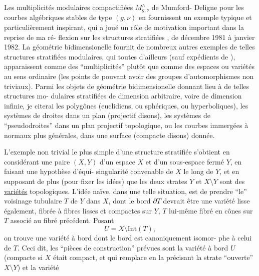 
Les multiplicités modulaires compactifiées $M^{\wedge}_{g,\nu}$ de Mumford-%
Deligne pour les courbes algébriques stables de type $(g,\nu)$ en
fournissent un exemple typique et particulièrement inspirant, qui
a joué un rôle de motivation important dans la reprise de ma ré-%
flexion sur les structures stratifiées , de décembre 1981 à janvier
1982. La géométrie bidimensionelle fournit de nombreux autres
exemples de telles structures stratifiées modulaires, qui toutes
d'ailleurs (sauf expédients de ), apparaissent
comme des ``multiplicités'' plutôt que comme des espaces ou variétés
au sens ordinaire (les points de  pouvant avoir
des groupes d'automorphismes non triviaux). Parmi les objets de
géométrie bidimensionelle donnant lieu à de telles structures mo-%
dulaires stratifiées de dimension arbitraire, voire de dimension
infinie, je citerai les polygônes (euclidiens, ou sphériques, ou
hyperboliques), les systèmes de droites dans un plan (projectif
disons), les systèmes de ``pseudodroites'' dans un plan projectif
topologique, ou les courbes immergées à  normaux plus
générales, dans une surface (compacte disons) donnée.

L'exemple non trivial le plus simple d'une structure
stratifiée s'obtient en considérant une paire $(X,Y)$ d'un espace
$X$ et d'un sous-espace fermé $Y$, en faisant une hypothèse d'équi-%
singularité convenable de $X$ le long de $Y$, et en supposant de
plus (pour fixer les idées) que les deux strates $Y$ et $X\setminus Y$ sont
des \uline{variétés} topologiques. L'idée naïve, dans une telle situation,
est de prendre ``le'' voisinage tubulaire $T$ de $Y$ dans $X$, dont
le bord $\partial T$ devrait être une variété lisse également, fibrée à
fibres lisses et compactes sur $Y$, $T$ lui-même 
fibré en cônes sur $T$ associé au fibré précédent. Posant
\[ U = X \setminus \mathrm{Int}(T), \]
on trouve une variété à bord dont le bord est canoniquement isomor-%
phe à celui de $T$. Ceci dit, les ``pièces de construction'' prévues
sont la variété à bord $U$ (compacte si $X$ était compact, et qui
remplace en la précisant la strate ``ouverte'' $X\setminus Y$) et la variété

